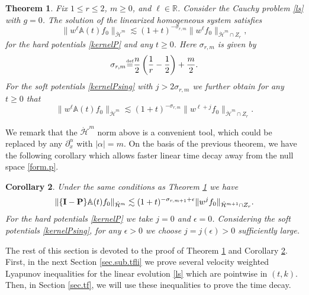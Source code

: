 \documentclass{amsart}
\newtheorem{theorem}{Theorem}[section]
\newtheorem{corollary}[theorem]{Corollary}
\numberwithin{equation}{section}
\begin{document}
\begin{theorem}\label{thm.ls}
Fix $1\leq r\leq 2$, $m \ge 0$,   and $\ell \in{\mathbb{R}}$.
Consider the Cauchy problem \eqref{ls} with ${g}=0$.  The solution of the
linearized homogeneous system satisfies 
\begin{equation}
 \|w^{\ell} {\mathbb{A}}(t){f}_0\|_{{\dot{\mathcal{H}}}^m}
\lesssim
(1+t)^{-\sigma_{r,m}}
\|w^{\ell}{f}_0\|_{{\dot{\mathcal{H}}}^m\cap Z_r},
 \label{thm.ls.1}
\end{equation}
for the hard potentials \eqref{kernelP} and any $t\geq 0$.  Here $\sigma_{r,m}$ is given by
\begin{equation}
\label{rateLIN}
    \sigma_{r,m}{\overset{\mbox{\tiny{def}}}{=}} \frac{n}{2}\left(\frac{1}{r}-\frac{1}{2}\right)+\frac{m}{2}.
\end{equation}
For the soft potentials \eqref{kernelPsing} with ${j} > 2 \sigma_{r,m}$ we further obtain for any $t\geq 0$ that
\begin{equation}
 \|w^{\ell} {\mathbb{A}}(t){f}_0\|_{{\dot{\mathcal{H}}}^m}
\lesssim
(1+t)^{-\sigma_{r,m}}  \|w^{{\ell}+{j}}{f}_0\|_{{\dot{\mathcal{H}}}^m \cap Z_r}.
 \label{thm.ls.1.soft}
\end{equation}
\end{theorem}

We remark that the ${\dot{\mathcal{H}}}^m$ norm above is a convenient tool, which could be replaced by any $\partial^{\alpha}_x$ with $|{\alpha} | =m$.  On the basis of the previous theorem, we have the following corollary which allows faster linear time decay away from the null space \eqref{form.p}.

\begin{corollary}\label{cor.ls}
Under the same conditions as Theorem \ref{thm.ls} we have
\begin{equation}
 \|\{{\mathbf{I}} - {\mathbf{P}}\}{\mathbb{A}}(t){f}_0\|_{{\dot{\mathcal{H}}}^m}
\lesssim
(1+t)^{-\sigma_{r,m+1}+\epsilon}\|w^{j}{f}_0\|_{{\dot{\mathcal{H}}}^{m+1}\cap Z_r}.
\notag
\end{equation}
For the hard potentials \eqref{kernelP} we take ${j}=0$ and $\epsilon =0$.   Considering the soft potentials \eqref{kernelPsing},
 for any $\epsilon>0$
 we choose ${j} = {j}(\epsilon)>0$ sufficiently large.  
\end{corollary}

The rest of this section is devoted to the proof of Theorem \ref{thm.ls} and Corollary \ref{cor.ls}.
First, in the next Section \ref{sec.sub.tfli} we prove several velocity weighted Lyapunov inequalities for the linear evolution \eqref{ls} which are pointwise in $(t,k)$.  Then, in Section \ref{sec.tf}, we will use these inequalities to prove the time decay.
\end{document}
